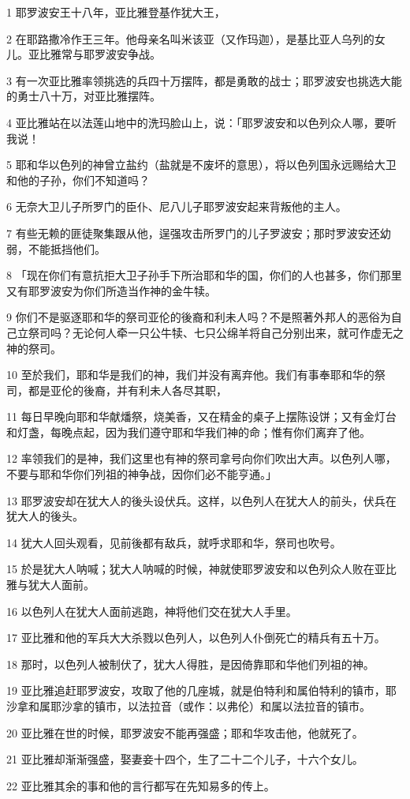 \par 1 耶罗波安王十八年，亚比雅登基作犹大王，
\par 2 在耶路撒冷作王三年。他母亲名叫米该亚（又作玛迦），是基比亚人乌列的女儿。亚比雅常与耶罗波安争战。
\par 3 有一次亚比雅率领挑选的兵四十万摆阵，都是勇敢的战士；耶罗波安也挑选大能的勇士八十万，对亚比雅摆阵。
\par 4 亚比雅站在以法莲山地中的洗玛脸山上，说：「耶罗波安和以色列众人哪，要听我说！
\par 5 耶和华以色列的神曾立盐约（盐就是不废坏的意思），将以色列国永远赐给大卫和他的子孙，你们不知道吗？
\par 6 无奈大卫儿子所罗门的臣仆、尼八儿子耶罗波安起来背叛他的主人。
\par 7 有些无赖的匪徒聚集跟从他，逞强攻击所罗门的儿子罗波安；那时罗波安还幼弱，不能抵挡他们。
\par 8 「现在你们有意抗拒大卫子孙手下所治耶和华的国，你们的人也甚多，你们那里又有耶罗波安为你们所造当作神的金牛犊。
\par 9 你们不是驱逐耶和华的祭司亚伦的後裔和利未人吗？不是照著外邦人的恶俗为自己立祭司吗？无论何人牵一只公牛犊、七只公绵羊将自己分别出来，就可作虚无之神的祭司。
\par 10 至於我们，耶和华是我们的神，我们并没有离弃他。我们有事奉耶和华的祭司，都是亚伦的後裔，并有利未人各尽其职，
\par 11 每日早晚向耶和华献燔祭，烧美香，又在精金的桌子上摆陈设饼；又有金灯台和灯盏，每晚点起，因为我们遵守耶和华我们神的命；惟有你们离弃了他。
\par 12 率领我们的是神，我们这里也有神的祭司拿号向你们吹出大声。以色列人哪，不要与耶和华你们列祖的神争战，因你们必不能亨通。」
\par 13 耶罗波安却在犹大人的後头设伏兵。这样，以色列人在犹大人的前头，伏兵在犹大人的後头。
\par 14 犹大人回头观看，见前後都有敌兵，就呼求耶和华，祭司也吹号。
\par 15 於是犹大人呐喊；犹大人呐喊的时候，神就使耶罗波安和以色列众人败在亚比雅与犹大人面前。
\par 16 以色列人在犹大人面前逃跑，神将他们交在犹大人手里。
\par 17 亚比雅和他的军兵大大杀戮以色列人，以色列人仆倒死亡的精兵有五十万。
\par 18 那时，以色列人被制伏了，犹大人得胜，是因倚靠耶和华他们列祖的神。
\par 19 亚比雅追赶耶罗波安，攻取了他的几座城，就是伯特利和属伯特利的镇市，耶沙拿和属耶沙拿的镇市，以法拉音（或作：以弗伦）和属以法拉音的镇市。
\par 20 亚比雅在世的时候，耶罗波安不能再强盛；耶和华攻击他，他就死了。
\par 21 亚比雅却渐渐强盛，娶妻妾十四个，生了二十二个儿子，十六个女儿。
\par 22 亚比雅其余的事和他的言行都写在先知易多的传上。

